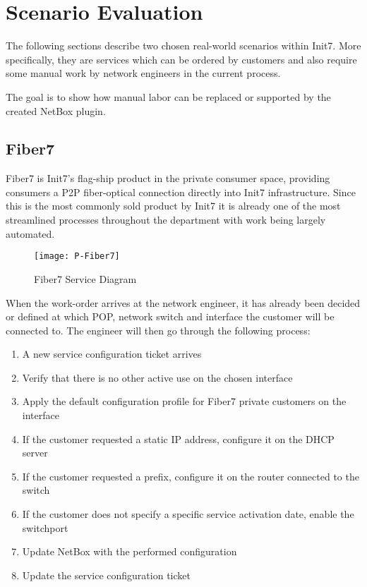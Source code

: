 \section{Scenario Evaluation}

The following sections describe two chosen real-world scenarios within Init7.
More specifically, they are services which can be ordered by customers and also
require some manual work by network engineers in the current process.

The goal is to show how manual labor can be replaced or supported by the
created NetBox plugin.

\subsection{Fiber7}

Fiber7 is Init7's flag-ship product in the private consumer space,
providing consumers a \acrshort{P2P} fiber-optical connection directly into
Init7 infrastructure. Since this is the most commonly sold product by Init7
it is already one of the most streamlined processes throughout the department
with work being largely automated.

\begin{figure}[h]
  \centering
  \texttt{[image: P-Fiber7]}
  \caption{Fiber7 Service Diagram}
  \label{fig:fiber7}
\end{figure}

When the work-order arrives at the network engineer, it has already been decided
or defined at which \acrshort{POP}, network switch and interface the customer
will be connected to. The engineer will then go through the following process:

\begin{enumerate}
  \item A new service configuration ticket arrives
  \item Verify that there is no other active use on the chosen interface
  \item Apply the default configuration profile for Fiber7 private customers on the interface
  \item If the customer requested a static IP address, configure it on the DHCP server
  \item If the customer requested a prefix, configure it on the router connected to the switch
  \item If the customer does not specify a specific service activation date, enable the switchport
  \item Update NetBox with the performed configuration
  \item Update the service configuration ticket
\end{enumerate}

